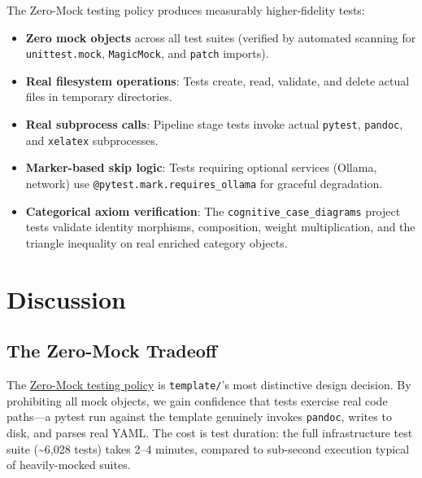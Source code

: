\documentclass[
]{article}
\providecommand{\tightlist}{%
  \setlength{\itemsep}{0pt}\setlength{\parskip}{0pt}}
\begin{document}
The Zero-Mock testing policy produces measurably higher-fidelity tests:

\begin{itemize}
\tightlist
\item
  \textbf{Zero mock objects} across all test suites (verified by
  automated scanning for \texttt{unittest.mock}, \texttt{MagicMock}, and
  \texttt{patch} imports).
\item
  \textbf{Real filesystem operations}: Tests create, read, validate, and
  delete actual files in temporary directories.
\item
  \textbf{Real subprocess calls}: Pipeline stage tests invoke actual
  \texttt{pytest}, \texttt{pandoc}, and \texttt{xelatex} subprocesses.
\item
  \textbf{Marker-based skip logic}: Tests requiring optional services
  (Ollama, network) use \texttt{@pytest.mark.requires\_ollama} for
  graceful degradation.
\item
  \textbf{Categorical axiom verification}: The
  \texttt{cognitive\_case\_diagrams} project tests validate identity
  morphisms, composition, weight multiplication, and the triangle
  inequality on real enriched category objects.
\end{itemize}

\newpage

\section{Discussion}\label{discussion}

\subsection{The Zero-Mock Tradeoff}\label{the-zero-mock-tradeoff}

The \href{03e_quality.md\#zero-mock-testing-policy}{Zero-Mock testing
policy} is \texttt{template/}'s most distinctive design decision. By
prohibiting all mock objects, we gain confidence that tests exercise
real code paths---a pytest run against the template genuinely invokes
\texttt{pandoc}, writes to disk, and parses real YAML. The cost is test
duration: the full infrastructure test suite (\textasciitilde6,028
tests) takes 2--4 minutes, compared to sub-second execution typical of
heavily-mocked suites.
\end{document}
